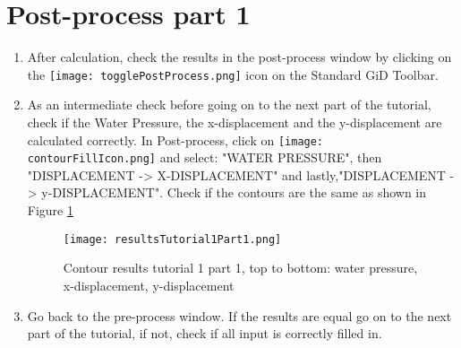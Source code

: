 \section{Post-process part 1}
\begin{enumerate}[resume]
	\item After calculation, check the results in the post-process window by clicking on the \texttt{[image: togglePostProcess.png]} icon on the Standard GiD Toolbar. 
	
	\item As an intermediate check before going on to the next part of the tutorial, check if the Water Pressure, the x-displacement and the y-displacement are calculated correctly. In Post-process, click on \texttt{[image: contourFillIcon.png]} and select: "WATER PRESSURE", then "DISPLACEMENT -> X-DISPLACEMENT" and lastly,"DISPLACEMENT -> y-DISPLACEMENT". Check if the contours are the same as shown in Figure \ref{fig:tut1_p1_results}
	
	\begin{figure}[h!]		
		\texttt{[image: resultsTutorial1Part1.png]}
		\caption{Contour results tutorial 1 part 1, top to bottom: water pressure, x-displacement, y-displacement}
		\label{fig:tut1_p1_results}
	\end{figure}

	\item Go back to the pre-process window. If the results are equal go on to the next part of the tutorial, if not, check if all input is correctly filled in.
	
\end{enumerate}

